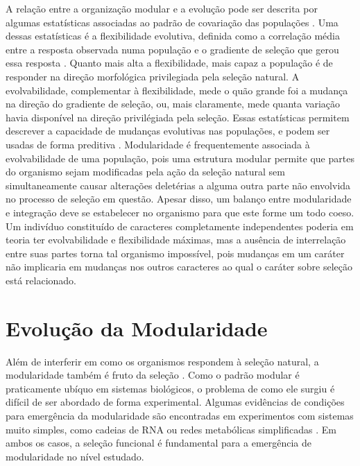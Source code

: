 A relação entre a organização modular e a evolução pode ser descrita por
algumas estatísticas associadas ao padrão de covariação das populações
\citep{Hansen2008}.
Uma dessas estatísticas é a flexibilidade evolutiva, definida como a
correlação média entre a resposta observada numa população e o gradiente
de seleção que gerou essa resposta \citep{Marroig2009}.
Quanto mais alta a flexibilidade, mais capaz a população é de responder
na direção morfológica privilegiada pela seleção natural.
A evolvabilidade, complementar à flexibilidade, mede o quão grande foi a
mudança na direção do gradiente de seleção, ou, mais claramente, mede
quanta variação havia disponível na direção privilégiada pela seleção.
Essas estatísticas permitem descrever a capacidade de mudanças evolutivas
nas populações, e podem ser usadas de forma preditiva
\citep[veja, por exemplo,][]{Marroig2010}.
Modularidade é frequentemente associada à evolvabilidade de uma
população, pois uma estrutura modular permite que partes do organismo sejam
modificadas pela ação da seleção natural sem simultaneamente causar
alterações deletérias a alguma outra parte não envolvida no processo de
seleção em questão.
Apesar disso, um balanço entre modularidade e integração deve se
estabelecer no organismo para que este forme um todo coeso.
Um indivíduo constituído de caracteres completamente independentes poderia
em teoria ter evolvabilidade e flexibilidade máximas, mas a ausência de
interrelação entre suas partes torna tal organismo impossível, pois
mudanças em um caráter não implicaria em mudanças nos outros caracteres
ao qual o caráter sobre seleção está relacionado.

\section{Evolução da Modularidade}\label{intro:evolucao}

Além de interferir em como os organismos respondem à seleção natural, a
modularidade também é fruto da seleção \citep{Wagner1996, Wagner2007}.
Como o padrão modular é praticamente ubíquo em sistemas biológicos, o
problema de como ele surgiu é difícil de ser abordado de forma
experimental.
Algumas evidências de condições para emergência da modularidade são
encontradas em experimentos com sistemas muito simples, como cadeias de
RNA \citep{Ancel2000} ou redes metabólicas simplificadas
\citep{Espinosa-Soto2010}.
Em ambos os casos, a seleção funcional é fundamental para a emergência
de modularidade no nível estudado.

